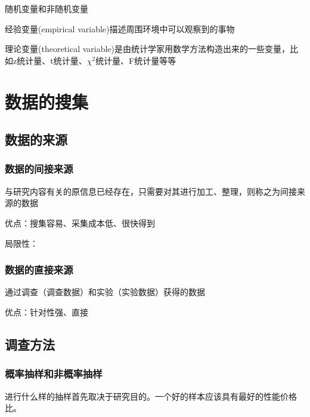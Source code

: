 \documentclass[UTF8,10pt]{book}
\begin{document}
    随机变量和非随机变量

    经验变量(empirical variable)描述周围环境中可以观察到的事物
    
    理论变量(theoretical variable)是由统计学家用数学方法构造出来的一些变量，比如z统计量、t统计量、$\chi^2$统计量、F统计量等等

\clearpage
\chapter{数据的搜集}




    \section{数据的来源}
    \subsection{数据的间接来源}

    与研究内容有关的原信息已经存在，只需要对其进行加工、整理，则称之为间接来源的数据

    优点：搜集容易、采集成本低、很快得到

    局限性：

    \subsection{数据的直接来源}

    通过调查（调查数据）和实验（实验数据）获得的数据
    
    优点：针对性强、直接

    \section{调查方法}

    \subsection{概率抽样和非概率抽样}

    进行什么样的抽样首先取决于研究目的。一个好的样本应该具有最好的性能价格比。
\end{document}
